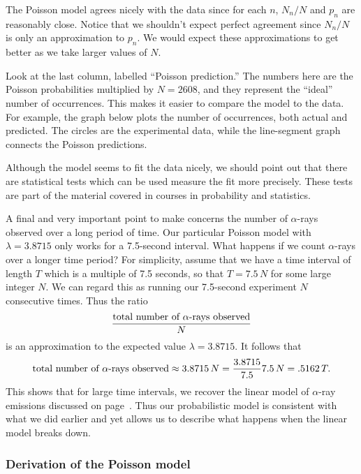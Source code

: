 The Poisson model agrees nicely with the data since
for each $n$, $N_n/N$ and $p_n$ are reasonably close.  Notice that we
shouldn't expect perfect agreement since $N_n/N$ is only an
approximation to $p_n$.  We would expect these approximations to get
better as we take larger values of $N$.

Look at the last column, labelled ``Poisson prediction.''  The numbers
here are the Poisson probabilities multiplied by $N = 2608$, and they
represent the ``ideal'' number of occurrences.  This makes it easier
to compare the model to the data.  For example, the graph below plots
the number of occurrences, both actual and predicted.  The circles are
the experimental data, while the line-segment graph connects the
Poisson predictions.

Although the model seems to fit the data nicely, we should point out
that there are statistical tests which can be used measure the fit
more precisely.  These tests are part of the material covered in
courses in probability and statistics.



A final and very important point to make concerns the number of
$\alpha$-rays observed over a long period of time.  Our particular
Poisson model with $\lambda=3.8715$ only works for a 7.5-second
interval.  What happens if we count $\alpha$-rays over a longer time
period?  For simplicity, assume that we have a time interval of length
$T$ which is a multiple of 7.5 seconds, so that $T = 7.5\,N$ for some
large integer $N$.  We can regard this as running our 7.5-second
experiment $N$ consecutive times. Thus the ratio
\[
\dfrac{\hbox{total number of $\alpha$-rays observed}}{N}
\]
is an approximation to the expected value $\lambda = 3.8715$.  It
follows that
\[
\hbox{total number of $\alpha$-rays observed} \approx 3.8715\,N
   = \dfrac{3.8715}{7.5}7.5\,N
   = .5162\,T.
\]
This shows that for large time intervals, we recover the linear model
of $\alpha$-ray emissions discussed on page~\pageref{linear}.  Thus
our probabilistic model is consistent with what we did earlier and yet
allows us to describe what happens when the linear model breaks down.

\subsubsection{Derivation of the Poisson model}
\label{subsubsec:derivation-of-the-poisson-model}

